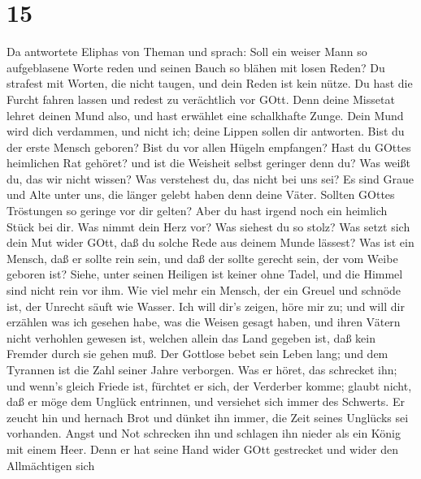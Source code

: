 \hypertarget{section-14}{%
\section{15}\label{section-14}}

 Da antwortete Eliphas von Theman und sprach: 
Soll ein weiser Mann so aufgeblasene Worte reden und seinen Bauch so
blähen mit losen Reden?  Du strafest mit Worten, die nicht
taugen, und dein Reden ist kein nütze.  Du hast die Furcht
fahren lassen und redest zu verächtlich vor GOtt.  Denn
deine Missetat lehret deinen Mund also, und hast erwählet eine
schalkhafte Zunge.  Dein Mund wird dich verdammen, und nicht
ich; deine Lippen sollen dir antworten.  Bist du der erste
Mensch geboren? Bist du vor allen Hügeln empfangen?  Hast du
GOttes heimlichen Rat gehöret? und ist die Weisheit selbst geringer denn
du?  Was weißt du, das wir nicht wissen? Was verstehest du,
das nicht bei uns sei?  Es sind Graue und Alte unter uns,
die länger gelebt haben denn deine Väter.  Sollten GOttes
Tröstungen so geringe vor dir gelten? Aber du hast irgend noch ein
heimlich Stück bei dir.  Was nimmt dein Herz vor? Was
siehest du so stolz?  Was setzt sich dein Mut wider GOtt,
daß du solche Rede aus deinem Munde lässest?  Was ist ein
Mensch, daß er sollte rein sein, und daß der sollte gerecht sein, der
vom Weibe geboren ist?  Siehe, unter seinen Heiligen ist
keiner ohne Tadel, und die Himmel sind nicht rein vor ihm. 
Wie viel mehr ein Mensch, der ein Greuel und schnöde ist, der Unrecht
säuft wie Wasser.  Ich will dir's zeigen, höre mir zu; und
will dir erzählen was ich gesehen habe,  was die Weisen
gesagt haben, und ihren Vätern nicht verhohlen gewesen ist,
 welchen allein das Land gegeben ist, daß kein Fremder
durch sie gehen muß.  Der Gottlose bebet sein Leben lang;
und dem Tyrannen ist die Zahl seiner Jahre verborgen.  Was
er höret, das schrecket ihn; und wenn's gleich Friede ist, fürchtet er
sich, der Verderber komme;  glaubt nicht, daß er möge dem
Unglück entrinnen, und versiehet sich immer des Schwerts. 
Er zeucht hin und hernach Brot und dünket ihn immer, die Zeit seines
Unglücks sei vorhanden.  Angst und Not schrecken ihn und
schlagen ihn nieder als ein König mit einem Heer.  Denn er
hat seine Hand wider GOtt gestrecket und wider den Allmächtigen sich
